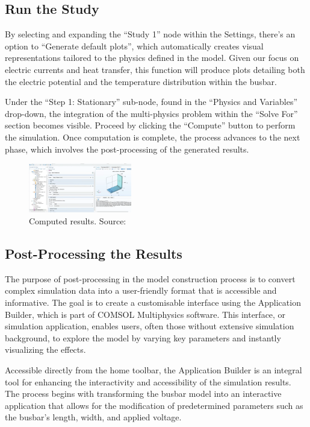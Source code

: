 \subsection{Run the Study}
By selecting and expanding the ``Study 1'' node within the Settings, there's an option to ``Generate default plots'', which automatically creates visual representations tailored to the physics defined in the model. Given our focus on electric currents and heat transfer, this function will produce plots detailing both the electric potential and the temperature distribution within the busbar.

Under the ``Step 1: Stationary'' sub-node, found in the ``Physics and Variables'' drop-down, the integration of the multi-physics problem within the ``Solve For'' section becomes visible. Proceed by clicking the ``Compute'' button to perform the simulation. Once computation is complete, the process advances to the next phase, which involves the post-processing of the generated results.

\begin{figure}[ht!]
  \centering
  \includegraphics[width=0.4\textwidth]{Chapters/Figures/Chapter 3 Figures/Computed Results.png}
  \caption{Computed results. Source: \cite{multiphysics__modeling_nodate}}
  \label{fig:computed results}
\end{figure}

\subsection{Post-Processing the Results}
The purpose of post-processing in the model construction process is to convert complex simulation data into a user-friendly format that is accessible and informative. The goal is to create a customisable interface using the Application Builder, which is part of COMSOL Multiphysics software. This interface, or simulation application, enables users, often those without extensive simulation background, to explore the model by varying key parameters and instantly visualizing the effects.

Accessible directly from the home toolbar, the Application Builder is an integral tool for enhancing the interactivity and accessibility of the simulation results. The process begins with transforming the busbar model into an interactive application that allows for the modification of predetermined parameters such as the busbar's length, width, and applied voltage.

